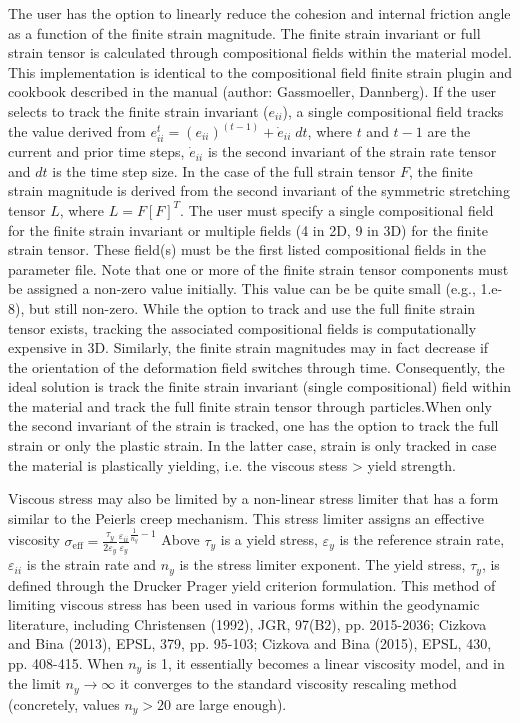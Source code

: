\begin{itemize}
The user has the option to linearly reduce the cohesion and internal friction angle as a function of the finite strain magnitude. The finite strain invariant or full strain tensor is calculated through compositional fields within the material model. This implementation is identical to the compositional field finite strain plugin and cookbook described in the manual (author: Gassmoeller, Dannberg). If the user selects to track the finite strain invariant ($e_{ii}$), a single compositional field tracks the value derived from $e_{ii}^t = (e_{ii})^{(t-1)} + \dot{e}_{ii}\; dt$, where $t$ and $t-1$ are the current and prior time steps, $\dot{e}_{ii}$ is the second invariant of the strain rate tensor and $dt$ is the time step size. In the case of the full strain tensor $F$, the finite strain magnitude is derived from the second invariant of the symmetric stretching tensor $L$, where $L = F [F]^T$. The user must specify a single compositional field for the finite strain invariant or multiple fields (4 in 2D, 9 in 3D) for the finite strain tensor. These field(s) must be the first listed compositional fields in the parameter file. Note that one or more of the finite strain tensor components must be assigned a non-zero value initially. This value can be be quite small (e.g., 1.e-8), but still non-zero. While the option to track and use the full finite strain tensor exists, tracking the associated compositional fields is computationally expensive in 3D. Similarly, the finite strain magnitudes may in fact decrease if the orientation of the deformation field switches through time. Consequently, the ideal solution is track the finite strain invariant (single compositional) field within the material and track the full finite strain tensor through particles.When only the second invariant of the strain is tracked, one has the option to track the full strain or only the plastic strain. In the latter case, strain is only tracked in case the material is plastically yielding, i.e. the viscous stess > yield strength. 

Viscous stress may also be limited by a non-linear stress limiter that has a form similar to the Peierls creep mechanism. This stress limiter assigns an effective viscosity $\sigma_{\text{eff}} = \frac{\tau_y}{2\varepsilon_y} {\frac{\varepsilon_{ii}}{\varepsilon_y}}^{\frac{1}{n_y}-1}$ Above $\tau_y$ is a yield stress, $\varepsilon_y$ is the reference strain rate, $\varepsilon_{ii}$ is the strain rate and $n_y$ is the stress limiter exponent.  The yield stress, $\tau_y$, is defined through the Drucker Prager yield criterion formulation. This method of limiting viscous stress has been used in various forms within the geodynamic literature, including Christensen (1992), JGR, 97(B2), pp. 2015-2036; Cizkova and Bina (2013), EPSL, 379, pp. 95-103; Cizkova and Bina (2015), EPSL, 430, pp. 408-415. When $n_y$ is 1, it essentially becomes a linear viscosity model, and in the limit $n_y\rightarrow \infty$ it converges to the standard viscosity rescaling method (concretely, values $n_y>20$ are large enough).


\end{itemize}
